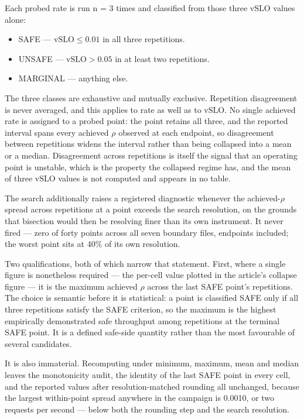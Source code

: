 \documentclass{ieeeaccess}
\begin{document}
Each probed rate is run n = 3 times and classified from those three $\mathrm{vSLO}$ values alone:

\begin{itemize}
\item SAFE --- $\mathrm{vSLO} \leq 0.01$ in all three repetitions.
\item UNSAFE --- $\mathrm{vSLO} > 0.05$ in at least two repetitions.
\item MARGINAL --- anything else.
\end{itemize}

The three classes are exhaustive and mutually exclusive. Repetition disagreement is never averaged, and this applies to rate as well as to $\mathrm{vSLO}$. No single achieved rate is assigned to a probed point: the point retains all three, and the reported interval spans every achieved $\rho$ observed at each endpoint, so disagreement between repetitions widens the interval rather than being collapsed into a mean or a median. Disagreement across repetitions is itself the signal that an operating point is unstable, which is the property the collapsed regime has, and the mean of three $\mathrm{vSLO}$ values is not computed and appears in no table.

The search additionally raises a registered diagnostic whenever the achieved-$\rho$ spread across repetitions at a point exceeds the search resolution, on the grounds that bisection would then be resolving finer than its own instrument. It never fired --- zero of forty points across all seven boundary files, endpoints included; the worst point sits at 40\% of its own resolution.

Two qualifications, both of which narrow that statement. First, where a single figure is nonetheless required --- the per-cell value plotted in the article's collapse figure --- it is the maximum achieved $\rho$ across the last SAFE point's repetitions. The choice is semantic before it is statistical: a point is classified SAFE only if all three repetitions satisfy the SAFE criterion, so the maximum is the highest empirically demonstrated safe throughput among repetitions at the terminal SAFE point. It is a defined safe-side quantity rather than the most favourable of several candidates.

It is also immaterial. Recomputing under minimum, maximum, mean and median leaves the monotonicity audit, the identity of the last SAFE point in every cell, and the reported values after resolution-matched rounding all unchanged, because the largest within-point spread anywhere in the campaign is 0.0010, or two requests per second --- below both the rounding step and the search resolution.
\end{document}
